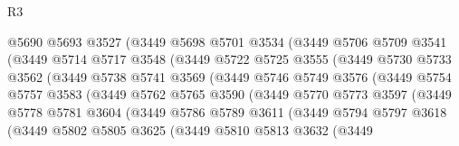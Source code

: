 \begin{lexlean}{R3}
\begin{coremodule}
                    @5690
                    @5693
                    @3527
                    (@3449
                      @5698
                      @5701
                      @3534
                      (@3449
                        @5706
                        @5709
                        @3541
                        (@3449
                          @5714
                          @5717
                          @3548
                          (@3449
                            @5722
                            @5725
                            @3555
                            (@3449
                              @5730
                              @5733
                              @3562
                              (@3449
                                @5738
                                @5741
                                @3569
                                (@3449
                                  @5746
                                  @5749
                                  @3576
                                  (@3449
                                    @5754
                                    @5757
                                    @3583
                                    (@3449
                                      @5762
                                      @5765
                                      @3590
                                      (@3449
                                        @5770
                                        @5773
                                        @3597
                                        (@3449
                                          @5778
                                          @5781
                                          @3604
                                          (@3449
                                            @5786
                                            @5789
                                            @3611
                                            (@3449
                                              @5794
                                              @5797
                                              @3618
                                              (@3449
                                                @5802
                                                @5805
                                                @3625
                                                (@3449
                                                  @5810
                                                  @5813
                                                  @3632
                                                  (@3449

\end{coremodule}
\end{lexlean}
